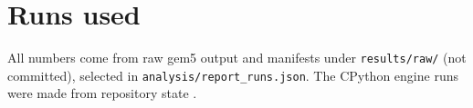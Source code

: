 \documentclass[11pt]{article}
\providecommand{\GeneratedDir}{../build/report/generated}
\begin{document}
\appendix
\section{Runs used}

All numbers come from raw gem5 output and manifests under \texttt{results/raw/} (not committed), selected in \texttt{analysis/report\_runs.json}.
The CPython engine runs were made from repository state \RunsCommit.

\begin{table}[H]
\centering\footnotesize

\end{table}
\end{document}
